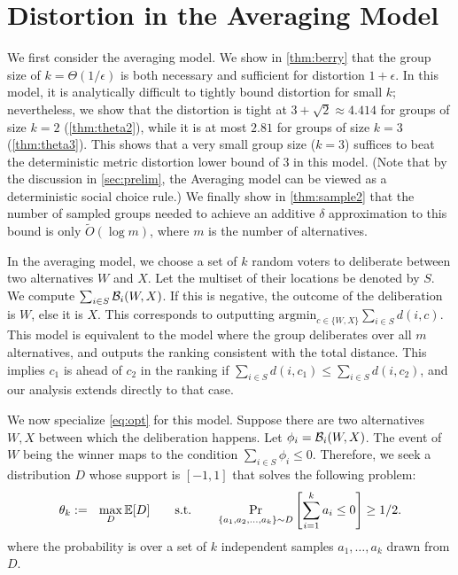 \section{Distortion in the Averaging Model}
\label{sec:avg}
We first consider the averaging model. We show in \cref{thm:berry} that the group size of $k = \Theta(1/\epsilon)$ is both necessary and sufficient for distortion $1+\epsilon$. In this model, it is analytically difficult to tightly bound distortion for small $k$; nevertheless, we show that the distortion is tight at $3+\sqrt{2} \approx 4.414$ for groups of size $k=2$ (\cref{thm:theta2}), while it is at most $2.81$ for groups of size $k=3$ (\cref{thm:theta3}). This shows that a very small group size ($k=3$) suffices to beat the deterministic metric distortion lower bound of $3$ in this model. (Note that by the discussion in \cref{sec:prelim}, the Averaging model can be viewed as a deterministic social choice rule.) We finally show in \cref{thm:sample2} that the number of sampled groups needed to achieve an additive $\delta$ approximation to this bound is only $\tilde{O}(\log m)$, where $m$ is the number of alternatives. 

In the averaging model, we choose a set of $k$ random voters to deliberate between two alternatives $W$ and $X$. Let the multiset of their locations be denoted by $S$. We compute $\sum_{i \in S} \mathcal{B}_i(W,X)$. If this is negative, the outcome of the deliberation is $W$, else it is $X$. This corresponds to outputting $\mbox{argmin}_{c \in \{W,X\}} \sum_{i \in S} d(i,c)$.  This model is equivalent to the model where the group deliberates over all $m$ alternatives, and outputs the ranking consistent with the total distance. This implies $c_1$ is ahead of $c_2$ in the ranking if $ \sum_{i \in S} d(i,c_1) \le \sum_{i \in S} d(i,c_2)$, and our analysis extends directly to that case.

We now specialize \cref{eq:opt} for this model. Suppose there are two alternatives $W,X$ between which the deliberation happens. Let $\phi_i = \mathcal{B}_i(W,X)$. The event of $W$ being the winner maps to the condition $\sum_{i \in S} \phi_i \le 0$. Therefore, we seek a distribution $D$ whose support is $[-1,1]$ that solves the following problem:
\begin{equation}
\label{eq:opt_avg}
\theta_k :=  \ \ \max_{D} \mathbb{E}[D] \qquad \mbox{s.t.} \qquad \Pr_{\{a_1,a_2,\ldots,a_k\} \sim D} \left[ \sum_{i=1}^k a_i \le 0 \right] \ge 1/2. 
\end{equation}
where the probability is over a set of $k$ independent samples $a_1,\ldots,a_k$ drawn from $D$.


